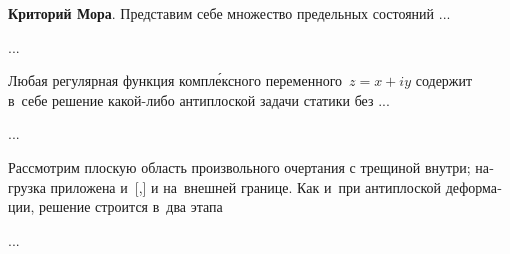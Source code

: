 \begin{otherlanguage}{russian}
\textbf{Криторий Мора}. Представим себе множество предельных состояний ...

...



\end{otherlanguage}



\begin{otherlanguage}{russian}

Любая регулярная функция компл\'{е}ксного переменного~${z = x + iy}$ содержит в~себе решение какой\hbox{-}либо антиплоской задачи статики без ...

...



\end{otherlanguage}



\begin{otherlanguage}{russian}

Рассмотрим плоскую область произвольного очертания с трещиной внутри; нагрузка приложена и~[,] и на~внешней границе. Как и~при антиплоской деформации, решение строится в~два этапа

...



\end{otherlanguage}



